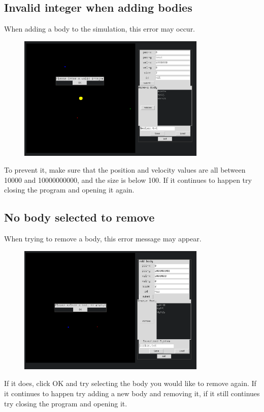 \documentclass[a4paper,11pt,titlepage]{article}
\begin{document}
\subsection{Invalid integer when adding bodies}
When adding a body to the simulation, this error may occur.
\begin{figure}[H]
	\centering
	\includegraphics[width=0.8\textwidth]{../img/add2.png}
\end{figure}
To prevent it, make sure that the position and velocity values are all between
10000 and 10000000000, and the size is below 100. If it continues to happen try
closing the program and opening it again.

\subsection{No body selected to remove}
When trying to remove a body, this error message may appear.
\begin{figure}[H]
	\centering
	\includegraphics[width=0.8\textwidth]{../img/rm3.png}
\end{figure}

If it does, click OK and try selecting the body you would like to remove again.
If it continues to happen try adding a new body and removing it, if it still
continues try closing the program and opening it.
\end{document}
